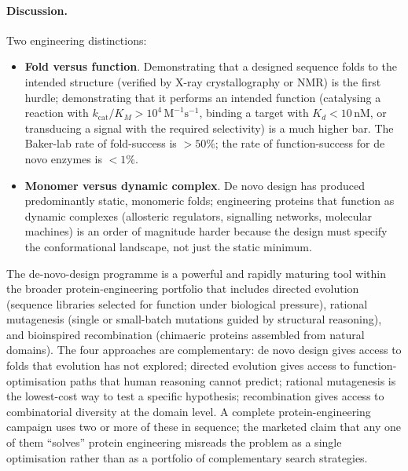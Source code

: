 \paragraph{Discussion.}
Two engineering distinctions:
\begin{itemize}[leftmargin=*]
\item \textbf{Fold versus function}. Demonstrating that a designed
  sequence folds to the intended structure (verified by X-ray
  crystallography or NMR) is the first hurdle; demonstrating that
  it performs an intended function (catalysing a reaction with
  $k_{\text{cat}}/K_M > 10^{4}\,\text{M}^{-1}\text{s}^{-1}$, binding
  a target with $K_d < 10\,\text{nM}$, or transducing a signal with
  the required selectivity) is a much higher bar. The Baker-lab
  rate of fold-success is $> 50\%$; the rate of function-success
  for de novo enzymes is $< 1\%$.
\item \textbf{Monomer versus dynamic complex}. De novo design has
  produced predominantly static, monomeric folds; engineering
  proteins that function as dynamic complexes (allosteric regulators,
  signalling networks, molecular machines) is an order of magnitude
  harder because the design must specify the conformational
  landscape, not just the static minimum.
\end{itemize}
The de-novo-design programme is a powerful and rapidly maturing tool
within the broader protein-engineering portfolio that includes
directed evolution (sequence libraries selected for function under
biological pressure), rational mutagenesis (single or small-batch
mutations guided by structural reasoning), and bioinspired
recombination (chimaeric proteins assembled from natural domains).
The four approaches are complementary: de novo design gives access
to folds that evolution has not explored; directed evolution gives
access to function-optimisation paths that human reasoning cannot
predict; rational mutagenesis is the lowest-cost way to test a
specific hypothesis; recombination gives access to combinatorial
diversity at the domain level. A complete protein-engineering
campaign uses two or more of these in sequence; the marketed claim
that any one of them ``solves'' protein engineering misreads the
problem as a single optimisation rather than as a portfolio of
complementary search strategies.
